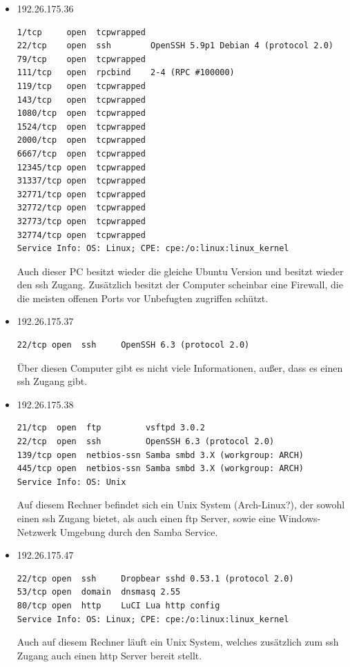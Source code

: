 \documentclass[10pt,a4paper]{article}
\begin{document}
\begin{itemize}
\item 192.26.175.36
\begin{verbatim}
1/tcp     open  tcpwrapped
22/tcp    open  ssh        OpenSSH 5.9p1 Debian 4 (protocol 2.0)
79/tcp    open  tcpwrapped
111/tcp   open  rpcbind    2-4 (RPC #100000)
119/tcp   open  tcpwrapped
143/tcp   open  tcpwrapped
1080/tcp  open  tcpwrapped
1524/tcp  open  tcpwrapped
2000/tcp  open  tcpwrapped
6667/tcp  open  tcpwrapped
12345/tcp open  tcpwrapped
31337/tcp open  tcpwrapped
32771/tcp open  tcpwrapped
32772/tcp open  tcpwrapped
32773/tcp open  tcpwrapped
32774/tcp open  tcpwrapped
Service Info: OS: Linux; CPE: cpe:/o:linux:linux_kernel
\end{verbatim}
Auch dieser PC besitzt wieder die gleiche Ubuntu Version und besitzt wieder den ssh Zugang. Zusätzlich besitzt der Computer scheinbar eine Firewall, die die meisten offenen Ports vor Unbefugten zugriffen schützt.

\item 192.26.175.37
\begin{verbatim}
22/tcp open  ssh     OpenSSH 6.3 (protocol 2.0)
\end{verbatim}
Über diesen Computer gibt es nicht viele Informationen, außer, dass es einen ssh Zugang gibt.

\item 192.26.175.38
\begin{verbatim}
21/tcp  open  ftp         vsftpd 3.0.2
22/tcp  open  ssh         OpenSSH 6.3 (protocol 2.0)
139/tcp open  netbios-ssn Samba smbd 3.X (workgroup: ARCH)
445/tcp open  netbios-ssn Samba smbd 3.X (workgroup: ARCH)
Service Info: OS: Unix
\end{verbatim}
Auf diesem Rechner befindet sich ein Unix System (Arch-Linux?), der sowohl einen ssh Zugang bietet, als auch einen ftp Server, sowie eine Windows-Netzwerk Umgebung durch den Samba Service.

\item 192.26.175.47
\begin{verbatim}
22/tcp open  ssh     Dropbear sshd 0.53.1 (protocol 2.0)
53/tcp open  domain  dnsmasq 2.55
80/tcp open  http    LuCI Lua http config
Service Info: OS: Linux; CPE: cpe:/o:linux:linux_kernel
\end{verbatim}
Auch auf diesem Rechner läuft ein Unix System, welches zusätzlich zum ssh Zugang auch einen http Server bereit stellt.



\end{itemize}
\end{document}
